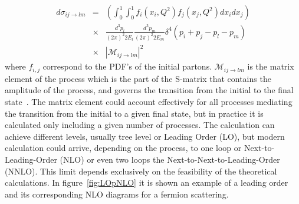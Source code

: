 \begin{eqnarray}
  \label{eq:DiffXS}
  d\sigma_{ij\rightarrow lm} & = & \left( \int_{0}^{1}\int_{0}^{1}f_{i}(x_{i},Q^{2})f_{j}(x_{j},Q^{2})dx_{i}dx_{j} \right) \nonumber \\  
 & \times & \frac{d^{3}p_{l}}{(2\pi)^{2}2E_{l}}\frac{d^{3}p_{m}}{(2\pi)^{2}2E_{m}}\delta^{4}\left( p_{i}+p_{j}-p_{l}-p_{m} \right) \nonumber \\  
 & \times & |\mathcal{M}_{ij\rightarrow lm}|^{2}
\end{eqnarray} where $f_{i,j}$ correspond to the PDF's of the initial partons. $\mathcal{M}_{ij\rightarrow lm}$ is the matrix element of the process which is the part of the S-matrix that contains the amplitude of the process, and governs the transition from the initial to the final state~\cite{opac-b1131978}. The matrix element could account effectively for all processes mediating the transition from the initial to a given final state, but in practice it is calculated only including a given number of processes. The calculation can achieve different levels, usually tree level or Leading Order (LO), but modern calculation could arrive, depending on the process, to one loop or Next-to-Leading-Order (NLO) or even two loops the  Next-to-Next-to-Leading-Order (NNLO). This limit depends exclusively on the feasibility of the theoretical calculations. In figure~\ref{fig:LOpNLO} it is shown an example of a leading order and its corresponding NLO diagrams for a fermion scattering.

